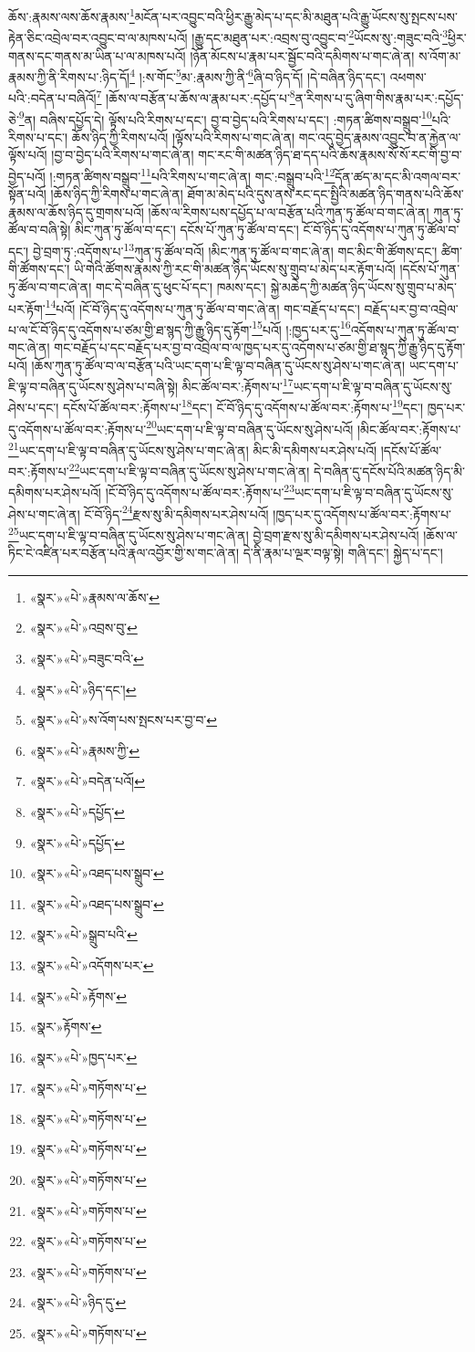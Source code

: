 ཆོས་:རྣམས་ལས་ཆོས་རྣམས་\footnote{«སྣར་»«པེ་»རྣམས་ལ་ཆོས་}མངོན་པར་འབྱུང་བའི་ཕྱིར་རྒྱུ་མེད་པ་དང་མི་མཐུན་པའི་རྒྱུ་ཡོངས་སུ་སྤངས་པས་རྟེན་ཅིང་འབྲེལ་བར་འབྱུང་བ་ལ་མཁས་པའོ། །རྒྱུ་དང་མཐུན་པར་:འབྲས་བུ་འབྱུང་བ་\footnote{«སྣར་»«པེ་»འབྲས་བུ་}ཡོངས་སུ་:གཟུང་བའི་\footnote{«སྣར་»«པེ་»བཟུང་བའི་}ཕྱིར་གནས་དང་གནས་མ་ཡིན་པ་ལ་མཁས་པའོ། །ཉོན་མོངས་པ་རྣམ་པར་སྦྱོང་བའི་དམིགས་པ་གང་ཞེ་ན། ས་འོག་མ་རྣམས་ཀྱི་ནི་རིགས་པ་:ཉིད་དོ།\footnote{«སྣར་»«པེ་»ཉིད་དང་།} །:ས་གོང་\footnote{«སྣར་»«པེ་»ས་འོག་པས་སྤངས་པར་བྱ་བ་}མ་:རྣམས་ཀྱི་ནི་\footnote{«སྣར་»«པེ་»རྣམས་ཀྱི་}ཞི་བ་ཉིད་དོ། །དེ་བཞིན་ཉིད་དང་། འཕགས་པའི་:བདེན་པ་བཞིའོ།\footnote{«སྣར་»«པེ་»བདེན་པའོ།} །ཆོས་ལ་བརྩོན་པ་ཆོས་ལ་རྣམ་པར་:དཔྱོད་པ་\footnote{«སྣར་»«པེ་»དཔྱོད་}ན་རིགས་པ་དུ་ཞིག་གིས་རྣམ་པར་:དཔྱོད་ཅེ་\footnote{«སྣར་»«པེ་»དཔྱོད་}ན། བཞིས་དཔྱོད་དེ། ལྟོས་པའི་རིགས་པ་དང་། བྱ་བ་བྱེད་པའི་རིགས་པ་དང་། :གཏན་ཚིགས་བསྒྲུབ་\footnote{«སྣར་»«པེ་»འཐད་པས་སྒྲུབ་}པའི་རིགས་པ་དང་། ཆོས་ཉིད་ཀྱི་རིགས་པའོ། །ལྟོས་པའི་རིགས་པ་གང་ཞེ་ན། གང་འདུ་བྱེད་རྣམས་འབྱུང་བ་ན་རྐྱེན་ལ་ལྟོས་པའོ། །བྱ་བ་བྱེད་པའི་རིགས་པ་གང་ཞེ་ན། གང་རང་གི་མཚན་ཉིད་ཐ་དད་པའི་ཆོས་རྣམས་སོ་སོ་རང་གི་བྱ་བ་བྱེད་པའོ། །:གཏན་ཚིགས་བསྒྲུབ་\footnote{«སྣར་»«པེ་»འཐད་པས་སྒྲུབ་}པའི་རིགས་པ་གང་ཞེ་ན། གང་:བསྒྲུབ་པའི་\footnote{«སྣར་»«པེ་»སྒྲུབ་པའི་}དོན་ཚད་མ་དང་མི་འགལ་བར་སྟོན་པའོ། །ཆོས་ཉིད་ཀྱི་རིགས་པ་གང་ཞེ་ན། ཐོག་མ་མེད་པའི་དུས་ནས་རང་དང་སྤྱིའི་མཚན་ཉིད་གནས་པའི་ཆོས་རྣམས་ལ་ཆོས་ཉིད་དུ་གྲགས་པའོ། །ཆོས་ལ་རིགས་པས་དཔྱོད་པ་ལ་བརྩོན་པའི་ཀུན་ཏུ་ཚོལ་བ་གང་ཞེ་ན། ཀུན་ཏུ་ཚོལ་བ་བཞི་སྟེ། མིང་ཀུན་ཏུ་ཚོལ་བ་དང་། དངོས་པོ་ཀུན་ཏུ་ཚོལ་བ་དང་། ངོ་བོ་ཉིད་དུ་འདོགས་པ་ཀུན་ཏུ་ཚོལ་བ་དང་། བྱེ་བྲག་ཏུ་:འདོགས་པ་\footnote{«སྣར་»«པེ་»འདོགས་པར་}ཀུན་ཏུ་ཚོལ་བའོ། །མིང་ཀུན་ཏུ་ཚོལ་བ་གང་ཞེ་ན། གང་མིང་གི་ཚོགས་དང་། ཚིག་གི་ཚོགས་དང་། ཡི་གེའི་ཚོགས་རྣམས་ཀྱི་རང་གི་མཚན་ཉིད་ཡོངས་སུ་གྲུབ་པ་མེད་པར་རྟོག་པའོ། །དངོས་པོ་ཀུན་ཏུ་ཚོལ་བ་གང་ཞེ་ན། གང་དེ་བཞིན་དུ་ཕུང་པོ་དང་། ཁམས་དང་། སྐྱེ་མཆེད་ཀྱི་མཚན་ཉིད་ཡོངས་སུ་གྲུབ་པ་མེད་པར་རྟོག་\footnote{«སྣར་»«པེ་»རྟོགས་}པའོ། །ངོ་བོ་ཉིད་དུ་འདོགས་པ་ཀུན་ཏུ་ཚོལ་བ་གང་ཞེ་ན། གང་བརྗོད་པ་དང་། བརྗོད་པར་བྱ་བ་འབྲེལ་པ་ལ་ངོ་བོ་ཉིད་དུ་འདོགས་པ་ཙམ་གྱི་ཐ་སྙད་ཀྱི་རྒྱུ་ཉིད་དུ་རྟོག་\footnote{«སྣར་»རྟོགས་}པའོ། །:ཁྱད་པར་དུ་\footnote{«སྣར་»«པེ་»ཁྱད་པར་}འདོགས་པ་ཀུན་ཏུ་ཚོལ་བ་གང་ཞེ་ན། གང་བརྗོད་པ་དང་བརྗོད་པར་བྱ་བ་འབྲེལ་བ་ལ་ཁྱད་པར་དུ་འདོགས་པ་ཙམ་གྱི་ཐ་སྙད་ཀྱི་རྒྱུ་ཉིད་དུ་རྟོག་པའོ། །ཆོས་ཀུན་ཏུ་ཚོལ་བ་ལ་བརྩོན་པའི་ཡང་དག་པ་ཇི་ལྟ་བ་བཞིན་དུ་ཡོངས་སུ་ཤེས་པ་གང་ཞེ་ན། ཡང་དག་པ་ཇི་ལྟ་བ་བཞིན་དུ་ཡོངས་སུ་ཤེས་པ་བཞི་སྟེ། མིང་ཚོལ་བར་:རྟོགས་པ་\footnote{«སྣར་»«པེ་»གཏོགས་པ་}ཡང་དག་པ་ཇི་ལྟ་བ་བཞིན་དུ་ཡོངས་སུ་ཤེས་པ་དང་། དངོས་པོ་ཚོལ་བར་:རྟོགས་པ་\footnote{«སྣར་»«པེ་»གཏོགས་པ་}དང་། ངོ་བོ་ཉིད་དུ་འདོགས་པ་ཚོལ་བར་:རྟོགས་པ་\footnote{«སྣར་»«པེ་»གཏོགས་པ་}དང་། ཁྱད་པར་དུ་འདོགས་པ་ཚོལ་བར་:རྟོགས་པ་\footnote{«སྣར་»«པེ་»གཏོགས་པ་}ཡང་དག་པ་ཇི་ལྟ་བ་བཞིན་དུ་ཡོངས་སུ་ཤེས་པའོ། །མིང་ཚོལ་བར་:རྟོགས་པ་\footnote{«སྣར་»«པེ་»གཏོགས་པ་}ཡང་དག་པ་ཇི་ལྟ་བ་བཞིན་དུ་ཡོངས་སུ་ཤེས་པ་གང་ཞེ་ན། མིང་མི་དམིགས་པར་ཤེས་པའོ། །དངོས་པོ་ཚོལ་བར་:རྟོགས་པ་\footnote{«སྣར་»«པེ་»གཏོགས་པ་}ཡང་དག་པ་ཇི་ལྟ་བ་བཞིན་དུ་ཡོངས་སུ་ཤེས་པ་གང་ཞེ་ན། དེ་བཞིན་དུ་དངོས་པོའི་མཚན་ཉིད་མི་དམིགས་པར་ཤེས་པའོ། །ངོ་བོ་ཉིད་དུ་འདོགས་པ་ཚོལ་བར་:རྟོགས་པ་\footnote{«སྣར་»«པེ་»གཏོགས་པ་}ཡང་དག་པ་ཇི་ལྟ་བ་བཞིན་དུ་ཡོངས་སུ་ཤེས་པ་གང་ཞེ་ན། ངོ་བོ་ཉིད་\footnote{«སྣར་»«པེ་»ཉིད་དུ་}རྫས་སུ་མི་དམིགས་པར་ཤེས་པའོ། །ཁྱད་པར་དུ་འདོགས་པ་ཚོལ་བར་:རྟོགས་པ་\footnote{«སྣར་»«པེ་»གཏོགས་པ་}ཡང་དག་པ་ཇི་ལྟ་བ་བཞིན་དུ་ཡོངས་སུ་ཤེས་པ་གང་ཞེ་ན། བྱེ་བྲག་རྫས་སུ་མི་དམིགས་པར་ཤེས་པའོ། །ཆོས་ལ་ཏིང་ངེ་འཛིན་པར་བརྩོན་པའི་རྣལ་འབྱོར་གྱི་ས་གང་ཞེ་ན། དེ་ནི་རྣམ་པ་ལྔར་བལྟ་སྟེ། གཞི་དང་། སྐྱེད་པ་དང་། 